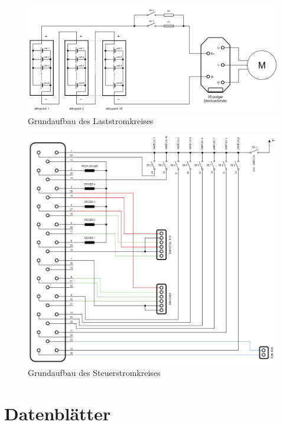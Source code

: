 \begin{figure}[H]
	\begin{center}
		\includegraphics[scale=0.35]{figures/Antrieb/Antrieb_Laststromkreis.png}
		\caption{Grundaufbau des Laststromkreises}
		\label{Grundaufbau_Laststromkreis}
	\end{center}
\end{figure}

\begin{figure}[H]
	\begin{center}
		\includegraphics[scale=0.67]{figures/Antrieb/Antrieb_Steuerstromkreis.png}
		\caption{Grundaufbau des Steuerstromkreises}
		\label{Grundaufbau_Steuerstromkreis}
	\end{center}
\end{figure}

\newpage

\chapter{Datenblätter}

